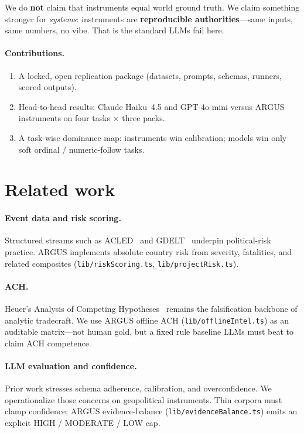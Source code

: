 \documentclass[11pt,a4paper]{article}
\begin{document}
We do \textbf{not} claim that instruments equal world ground truth.
We claim something stronger for \emph{systems}: instruments are \textbf{reproducible authorities}---same inputs, same numbers, no vibe.
That is the standard LLMs fail here.

\paragraph{Contributions.}
\begin{enumerate}
  \item A locked, open replication package (datasets, prompts, schemas, runners, scored outputs).
  \item Head-to-head results: Claude Haiku~4.5 and GPT-4o-mini versus ARGUS instruments on four tasks $\times$ three packs.
  \item A task-wise dominance map: instruments win calibration; models win only soft ordinal / numeric-follow tasks.
\end{enumerate}

\section{Related work}

\paragraph{Event data and risk scoring.}
Structured streams such as ACLED~\citep{raleigh2010} and GDELT~\citep{leetaru2013}
underpin political-risk practice.
ARGUS implements absolute country risk from severity, fatalities, and related composites
(\texttt{lib/riskScoring.ts}, \texttt{lib/projectRisk.ts}).

\paragraph{ACH.}
Heuer's Analysis of Competing Hypotheses~\citep{heuer1999} remains the falsification backbone of analytic tradecraft.
We use ARGUS offline ACH (\texttt{lib/offlineIntel.ts}) as an auditable matrix---not human gold,
but a fixed rule baseline LLMs must beat to claim ACH competence.

\paragraph{LLM evaluation and confidence.}
Prior work stresses schema adherence, calibration, and overconfidence.
We operationalize those concerns on geopolitical instruments.
Thin corpora must clamp confidence; ARGUS evidence-balance
(\texttt{lib/evidenceBalance.ts}) emits an explicit HIGH / MODERATE / LOW cap.
\end{document}
